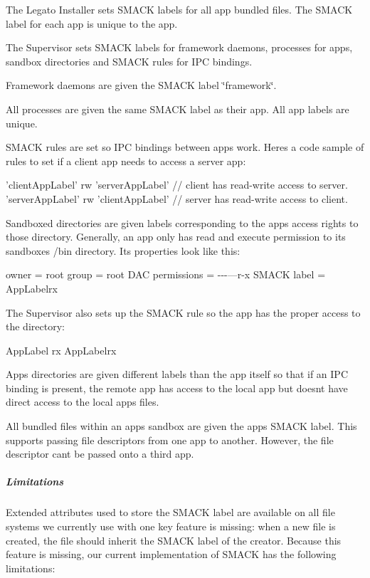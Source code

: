 The Legato Installer sets S\+M\+A\+C\+K labels for all app bundled files. The S\+M\+A\+C\+K label for each app is unique to the app.

The Supervisor sets S\+M\+A\+C\+K labels for framework daemons, processes for apps, sandbox directories and S\+M\+A\+C\+K rules for I\+P\+C bindings.

Framework daemons are given the S\+M\+A\+C\+K label \char`\"{}framework\char`\"{}.

All processes are given the same S\+M\+A\+C\+K label as their app. All app labels are unique.

S\+M\+A\+C\+K rules are set so I\+P\+C bindings between apps work. Here\textquotesingle{}s a code sample of rules to set if a client app needs to access a server app\+:


\begin{DoxyCode}
\textcolor{stringliteral}{'clientAppLabel'} rw \textcolor{stringliteral}{'serverAppLabel'}     \textcolor{comment}{// client has read-write access to server.}
\textcolor{stringliteral}{'serverAppLabel'} rw \textcolor{stringliteral}{'clientAppLabel'}     \textcolor{comment}{// server has read-write access to client.}
\end{DoxyCode}


Sandboxed directories are given labels corresponding to the app\textquotesingle{}s access rights to those directory. Generally, an app only has read and execute permission to its sandboxes /bin directory. Its properties look like this\+:

owner = root group = root D\+A\+C permissions = -\/-\/-\/---r-\/x S\+M\+A\+C\+K label = \textquotesingle{}App\+Labelrx\textquotesingle{}

The Supervisor also sets up the S\+M\+A\+C\+K rule so the app has the proper access to the directory\+:

\textquotesingle{}App\+Label\textquotesingle{} rx \textquotesingle{}App\+Labelrx\textquotesingle{}

App\textquotesingle{}s directories are given different labels than the app itself so that if an I\+P\+C binding is present, the remote app has access to the local app but doesn\textquotesingle{}t have direct access to the local app\textquotesingle{}s files.

All bundled files within an app\textquotesingle{}s sandbox are given the app\textquotesingle{}s S\+M\+A\+C\+K label. This supports passing file descriptors from one app to another. However, the file descriptor can\textquotesingle{}t be passed onto a third app.\hypertarget{basic_security_smack_advanced_basicSecuritySmackAdvanced_limitations}{}\subparagraph{Limitations}\label{basic_security_smack_advanced_basicSecuritySmackAdvanced_limitations}
Extended attributes used to store the S\+M\+A\+C\+K label are available on all file systems we currently use with one key feature is missing\+: when a new file is created, the file should inherit the S\+M\+A\+C\+K label of the creator. Because this feature is missing, our current implementation of S\+M\+A\+C\+K has the following limitations\+:


